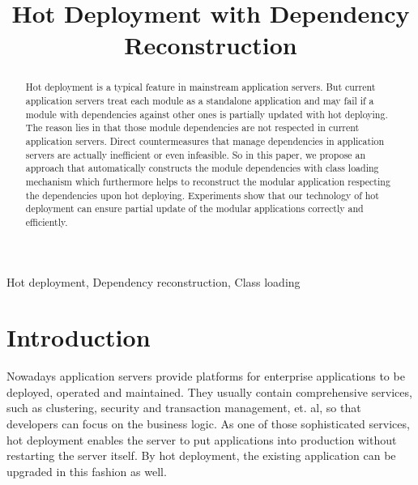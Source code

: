 \documentclass[conference]{IEEEtran}
\begin{document}
\title{Hot Deployment with Dependency Reconstruction}

\author{
}

\maketitle


\begin{abstract}
Hot deployment is a typical feature in mainstream application servers. But current application servers treat each module as a standalone application and may fail if a module with dependencies against other ones is partially updated with hot deploying. The reason lies in that those module dependencies are not respected in current application servers. Direct countermeasures that manage dependencies in application servers are actually inefficient or even infeasible. So in this paper, we propose an approach that automatically constructs the module dependencies with class loading mechanism which furthermore helps to reconstruct the modular application respecting the dependencies upon hot deploying. Experiments show that our technology of hot deployment can ensure partial update of the modular applications correctly and efficiently.
\end{abstract}

\begin{IEEEkeywords}
Hot deployment, Dependency reconstruction, Class loading
\end{IEEEkeywords}


\IEEEpeerreviewmaketitle


\section{Introduction\label{sec:introduction}}

Nowadays application servers\cite{app_server} provide platforms for enterprise applications to be deployed, operated and maintained. They usually contain comprehensive services, such as clustering, security and transaction management, et. al, so that developers can focus on the business logic. As one of those sophisticated services, hot deployment enables the server to put applications into production without restarting the server itself. By hot deployment, the existing application can be upgraded in this fashion as well.
\end{document}
